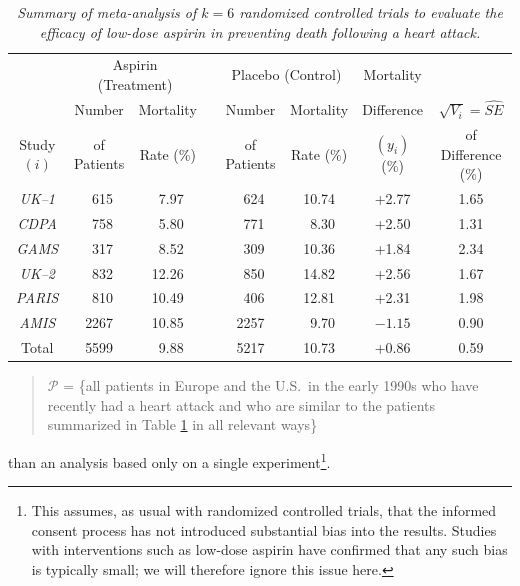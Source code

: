 \documentclass[12pt]{article}
\begin{document}
\begin{table}[t!]

\centering

\caption{\textit{Summary of meta-analysis of $k = 6$ randomized controlled trials to evaluate the efficacy of low-dose aspirin in preventing death following a heart attack.}}

\label{t:aspirin-case-study-data}

\bigskip

\begin{tabular}{c||cc|ccc|cc}

\multicolumn{1}{c}{} & \multicolumn{2}{c}{Aspirin (Treatment)} & & \multicolumn{2}{c}{Placebo (Control)} & Mortality \\ \cline{2-3} \cline{5-6}
\multicolumn{1}{c}{} & Number & \multicolumn{1}{c}{Mortality} & & Number & \multicolumn{1}{c}{Mortality} & Difference & $\sqrt{ V_i } = \widehat{ SE }$ \\
\multicolumn{1}{c}{Study $( i )$} & of Patients & \multicolumn{1}{c}{Rate (\%)} & & of Patients & \multicolumn{1}{c}{Rate (\%)} & $( y_i )$ (\%) & of Difference (\%) \\

\hline

\textit{UK--1} & \ 615 & \ 7.97 & & \ 624 & 10.74 & +2.77 & 1.65 \\

\textit{CDPA} & \ 758 & \ 5.80 & & \ 771 & \ 8.30 & +2.50 & 1.31 \\

\textit{GAMS} & \ 317 & \ 8.52 & & \ 309 & 10.36 & +1.84 & 2.34 \\

\textit{UK--2} & \ 832 & 12.26 & & \ 850 & 14.82 & +2.56 & 1.67 \\

\textit{PARIS} & \ 810 & 10.49 & & \ 406 & 12.81 & +2.31 & 1.98 \\

\textit{AMIS} & 2267 & 10.85 & & 2257 & \ 9.70 & $-1.15$ & 0.90 \\

\hline

Total & 5599 & \ 9.88 & & 5217 & 10.73 & +0.86 & 0.59

\end{tabular}

\end{table}

\begin{quote}

$\mathcal{ P }$ = \{all patients in Europe and the U.S.~in the early 1990s who have recently had a heart attack and who are similar to the patients summarized in Table \ref{t:aspirin-case-study-data} in all relevant ways\}

\end{quote}
than an analysis based only on a single experiment\footnote{This assumes, as usual with randomized controlled trials, that the informed consent process has not introduced substantial bias into the results. Studies with interventions such as low-dose aspirin have confirmed that any such bias is typically small; we will therefore ignore this issue here.}.
\end{document}
